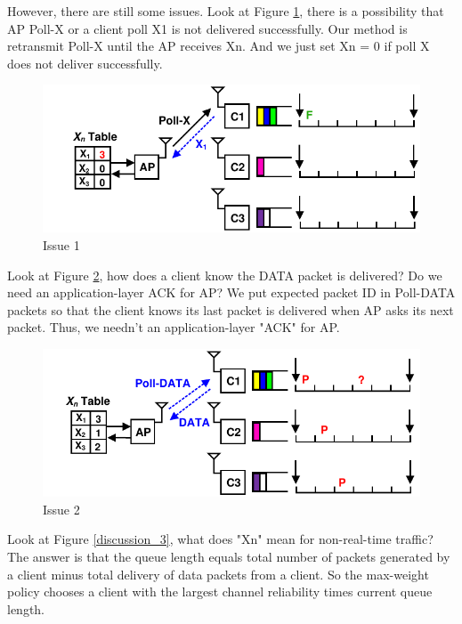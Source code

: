 \documentclass{article}
\begin{document}
However, there are still some issues. Look at Figure \ref{discussion_1}, there is a possibility that AP Poll-X or a client poll X1 is not delivered successfully. Our method is retransmit Poll-X until the AP receives Xn. And we just set Xn = 0 if poll X does not deliver successfully. 

\begin{figure}[htbp]
\centering
\includegraphics[scale=0.8]{discussion_1.pdf}
\caption{Issue 1}
\label{discussion_1}
\end{figure}

Look at Figure \ref{discussion_2}, how does a client know the DATA packet is delivered? Do we need an application-layer ACK for AP?  We put expected packet ID in Poll-DATA packets so that the client knows its last packet is delivered when AP asks its next packet. Thus, we needn't an application-layer "ACK" for AP. 

\begin{figure}[htbp]
\centering
\includegraphics[scale=0.8]{discussion_2.pdf}
\caption{Issue 2}
\label{discussion_2}
\end{figure}

Look at Figure \ref{discussion_3}, what does "Xn" mean for non-real-time traffic? The answer is that the queue length equals total number of packets generated by a client minus total delivery of data packets from a client. So the max-weight policy chooses a client with the largest channel reliability times current queue length. 
\end{document}
